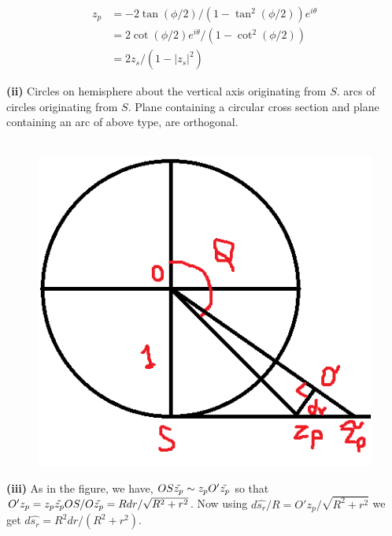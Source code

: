 \documentclass{article}
\def\tf{\textbf}
\def\td{\ensuremath\tilde}
\begin{document}
\begin{align*}
    z_p &= -2\tan(\phi/2)/(1-\tan^2(\phi/2))e^{i\theta} \\
    &= 2\cot(\phi/2)e^{i\theta}/(1-\cot^2(\phi/2))\\
    &= 2z_s/(1-|z_s|^2)    
\end{align*}

\tf{(ii)} Circles on hemisphere about the vertical axis originating from $S$. arcs of circles originating from $S$. Plane containing a circular cross section and plane containing an arc of above type, are orthogonal.\\~\\

\begin{figure}[h!]
    \centering
    \includegraphics[scale=0.7]{6_14_2}
    \label{6_14_2}
\end{figure}

\tf{(iii)} As in the figure, we have, $OS\td{z_p} \sim z_pO'\td{z_p}$ so that $O'z_p = z_p\td{z_p}OS/O\td{z_p} = Rdr/\sqrt{R^2+r^2}$. Now using $d\hat{s_r}/R = O'z_p/\sqrt{R^2+r^2}$ we get $d\hat{s_r} = R^2dr/(R^2+r^2)$.\\~\\
\end{document}
